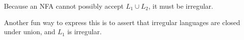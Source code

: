 \documentclass{report}
\begin{document}
Because an NFA cannot possibly accept $L_1 \cup L_2$, it must be irregular.

Another fun way to express this is to assert that irregular languages are closed under union, and $L_1$ is irregular.




%
%
\end{document}
